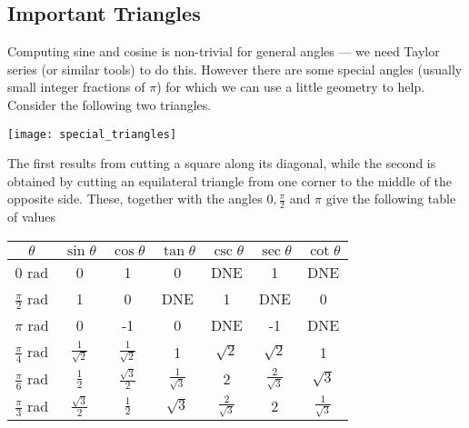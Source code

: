 \subsection{Important Triangles}\label{ssec_B_2_3}
Computing sine and cosine is non-trivial for general angles --- we need Taylor series (or
similar tools) to do this. However there are some special angles (usually small
integer fractions of $\pi$) for which we can use a little geometry to help. Consider the
following two triangles.
\begin{center}
  \texttt{[image: special\_triangles]}
\end{center}
The first results from cutting a square along its diagonal, while the second is obtained
by cutting an equilateral triangle from one corner to the middle of the opposite side.
These, together with the angles $0,\frac{\pi}{2}$ and $\pi$ give the following table of
values
\begin{center}
\renewcommand{\arraystretch}{1.3}
     \begin{tabular}{|c||c|c|c||c|c|c|}
          \hline
         $\theta$ & $\sin\theta$ & $\cos\theta$ & $\tan\theta$  &
                    $\csc\theta$ & $\sec\theta$ & $\cot\theta$   \\  \hline\hline
        $0$ rad & 0 & 1 & 0 & DNE & 1 & DNE  \\ \hline
        $\tfrac{\pi}{2}$ rad  & 1 & 0  & DNE & 1& DNE & 0 \\ \hline
        $\pi$ rad & 0 & -1 & 0 & DNE & -1 & DNE \\ \hline\hline
         $\tfrac{\pi}{4}$ rad &
            $\tfrac{1}{\sqrt{2}}$ & $\tfrac{1}{\sqrt{2}}$ & 1 &
            $\sqrt{2}$ & $\sqrt{2}$ & 1 \\ \hline\hline
        $\tfrac{\pi}{6}$ rad &
            $\tfrac{1}{2}$ & $\tfrac{\sqrt{3}}{2}$ & $\tfrac{1}{\sqrt{3}}$ &
            2 & $\tfrac{2}{\sqrt{3}}$ & $\sqrt{3}$  \\ \hline
        $\tfrac{\pi}{3}$ rad &
            $\tfrac{\sqrt{3}}{2}$ & $\tfrac{1}{2}$ & $\sqrt{3}$ &
            $\tfrac{2}{\sqrt{3}}$ &  2 & $\tfrac{1}{\sqrt{3}}$  \\ \hline
     \end{tabular}
\renewcommand{\arraystretch}{1.0}
\end{center}




